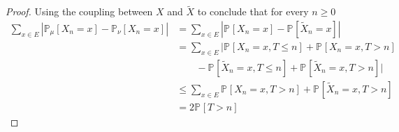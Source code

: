 \begin{proof}
Using the coupling between $X$ and $\tilde{X}$ to conclude that for every $n\geq 0$ 
\begin{align}
	\sum_{x \in E}^{} \left| \mathbb{P}_{\mu} \left[ X_n = x \right] - \mathbb{P}_{\nu } \left[ X_n=x \right] \right|
	&= \sum_{x \in E}^{} \left| \mathbb{P}_{} \left[X_n =x  \right] - \mathbb{P}_{} \left[ \tilde{X}_n = x \right] \right| \\
	&= \sum_{x \in E}^{} \Big| \mathbb{P}_{} \left[ X_n =x, T \leq n \right] + \mathbb{P}_{} \left[ X_n = x, T>n \right] \\
	&\qquad  - \mathbb{P}_{} \left[ \tilde{X}_n = x, T \leq n \right] + \mathbb{P}_{} \left[ \tilde{X}_n = x, T>n \right] \Big| \\
	&\leq \sum_{x \in E}^{} \mathbb{P}_{} \left[ X_n=x, T>n \right] + \mathbb{P}_{} \left[ \tilde{X}_n=x, T>n \right]\\
	&= 2\mathbb{P}_{} \left[ T>n \right] 
\end{align}
\end{proof}

